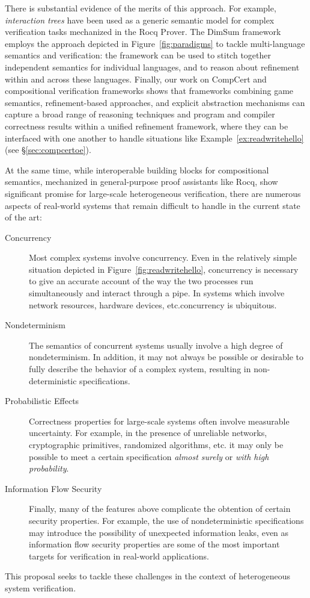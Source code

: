 There is substantial evidence of the merits of this approach.
For example,
\emph{interaction trees} \cite{itrees} have been used
as a generic semantic model for complex verification tasks
mechanized in the Rocq Prover.
The DimSum framework \cite{dimsum}
employs the approach depicted in Figure~\ref{fig:paradigms}
to tackle multi-language semantics and verification:
the framework can be used to stitch together
independent semantics for individual languages,
and to reason about refinement within and across
these languages.
Finally,
our work on CompCert \cite{compcerto}
and compositional verification frameworks \cite{compcertoe}
shows that frameworks combining
game semantics,
refinement-based approaches, and
explicit abstraction mechanisms
can capture a broad range of
reasoning techniques and
program and compiler correctness results
within a unified refinement framework,
where they can be interfaced with one another
to handle situations like Example~\ref{ex:readwritehello}
(see \S\ref{sec:compcertoe}).

At the same time,
while interoperable building blocks for compositional semantics,
mechanized in general-purpose proof assistants like Rocq,
show significant promise
for large-scale heterogeneous verification,
there are numerous aspects of real-world systems that
remain difficult to handle in the current state of the art:
\begin{description}
  \item[Concurrency]
    Most complex systems involve concurrency.
    Even in the relatively simple situation depicted
    in Figure~\ref{fig:readwritehello},
    concurrency is necessary to give an accurate account
    of the way the two processes run simultaneously
    and interact through a pipe.
    In systems which involve network resources,
    hardware devices, etc.\@ concurrency is ubiquitous.
  \item[Nondeterminism]
    The semantics of concurrent systems
    usually involve a high degree of nondeterminism.
    In addition,
    it may not always be possible or desirable to
    fully describe the behavior of a complex system,
    resulting in non-deterministic specifications.
  \item[Probabilistic Effects]
    Correctness properties for large-scale systems
    often involve measurable uncertainty.
    For example,
    in the presence of
    unreliable networks,
    cryptographic primitives,
    randomized algorithms,
    etc.\@ 
    it may only be possible to meet a certain specification
    \emph{almost surely} or \emph{with high probability}.
  \item[Information Flow Security]
    Finally,
    many of the features above
    complicate the obtention of certain security properties.
    For example,
    the use of nondeterministic specifications
    may introduce the possibility of unexpected information leaks,
    even as information flow security properties
    are some of the most important targets for verification
    in real-world applications.
\end{description}
This proposal seeks to tackle these challenges
in the context of heterogeneous system verification.

